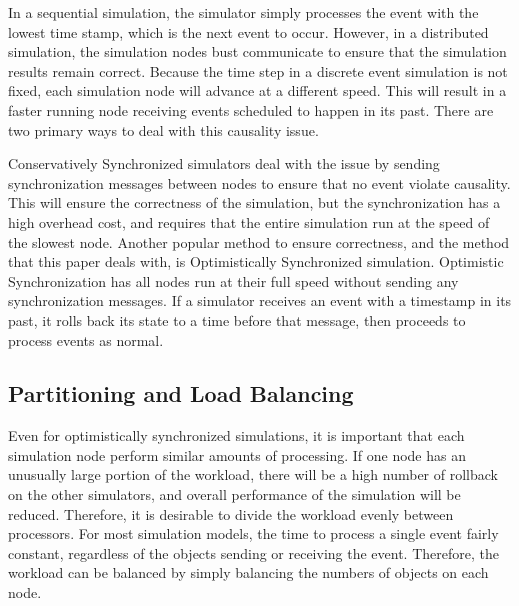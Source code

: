 \documentclass{wscpaperproc}
\begin{document}
In a sequential simulation, the simulator simply processes the event with the lowest time stamp, which is the next event to occur. However, in a distributed simulation, the simulation nodes bust communicate to ensure that the simulation results remain correct. Because the time step in a discrete event simulation is not fixed, each simulation node will advance at a different speed. This will result in a faster running node receiving events scheduled to happen in its past. There are two primary ways to deal with this causality issue. 

Conservatively Synchronized simulators deal with the issue by sending synchronization messages between nodes to ensure that no event violate causality. This will ensure the correctness of the simulation, but the synchronization has a high overhead cost, and requires that the entire simulation run at the speed of the slowest node. Another popular method to ensure correctness, and the method that this paper deals with, is Optimistically Synchronized simulation. Optimistic Synchronization has all nodes run at their full speed without sending any synchronization messages. If a simulator receives an event with a timestamp in its past, it rolls back its state to a time before that message, then proceeds to process events as normal. 

\subsection{Partitioning and Load Balancing}

Even for optimistically synchronized simulations, it is important that each simulation node perform similar amounts of processing. If one node has an unusually large portion of the workload, there will be a high number of rollback on the other simulators, and overall performance of the simulation will be reduced. Therefore, it is desirable to divide the workload evenly between processors. For most simulation models, the time to process a single event fairly constant, regardless of the objects sending or receiving the event. Therefore, the workload can be balanced by simply balancing the numbers of objects on each node.
\end{document}
